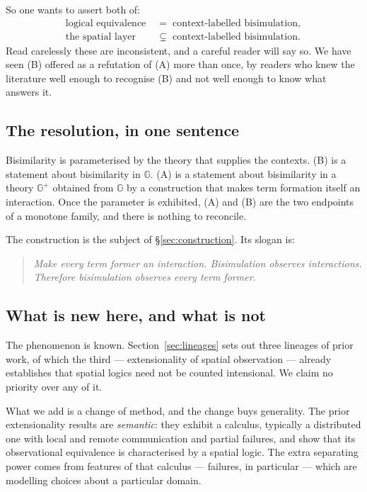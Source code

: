\documentclass[11pt]{article}
\theoremstyle{plain}
\theoremstyle{definition}
\newcommand{\Gg}{\mathbb{G}}
\begin{document}
So one wants to assert both of:
\begin{align}
\text{logical equivalence} \;&=\; \text{context-labelled bisimulation}, \tag{A} \\
\text{the spatial layer} \;&\subsetneq\; \text{context-labelled bisimulation}. \tag{B}
\end{align}
Read carelessly these are inconsistent, and a careful reader will say so. We have seen (B) offered as
a refutation of (A) more than once, by readers who knew the literature well enough to recognise (B)
and not well enough to know what answers it.

\subsection{The resolution, in one sentence}

Bisimilarity is parameterised by the theory that supplies the contexts. (B) is a statement about
bisimilarity in $\Gg$. (A) is a statement about bisimilarity in a theory $\Gg^+$ obtained from $\Gg$
by a construction that makes term formation itself an interaction. Once the parameter is exhibited,
(A) and (B) are the two endpoints of a monotone family, and there is nothing to reconcile.

The construction is the subject of \S\ref{sec:construction}. Its slogan is:

\begin{quote}
\itshape Make every term former an interaction. Bisimulation observes interactions. Therefore
bisimulation observes every term former.
\end{quote}

\subsection{What is new here, and what is not}
\label{sec:contribution}

The phenomenon is known. Section~\ref{sec:lineages} sets out three lineages of prior work, of which
the third --- extensionality of spatial observation --- already establishes that spatial logics need
not be counted intensional. We claim no priority over any of it.

What we add is a change of method, and the change buys generality. The prior extensionality results
are \emph{semantic}: they exhibit a calculus, typically a distributed one with local and remote
communication and partial failures, and show that its observational equivalence is characterised by a
spatial logic. The extra separating power comes from features of that calculus --- failures, in
particular --- which are modelling choices about a particular domain.
\end{document}

